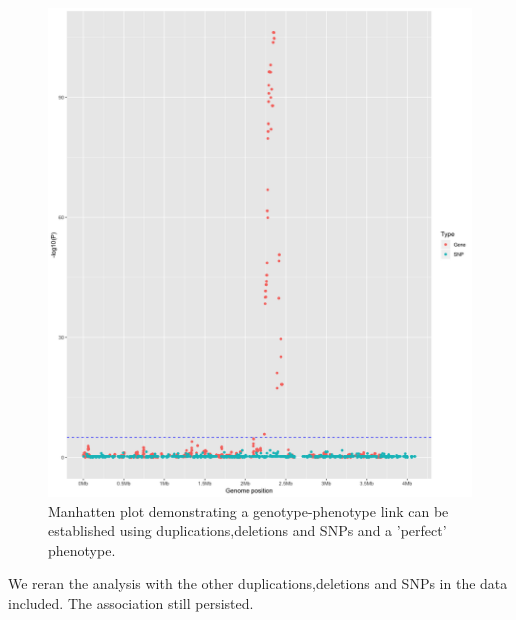 \documentclass{article}
\begin{document}
\clearpage
\begin{figure}[h!]
\centering
\includegraphics[width=\textwidth]{Chapter_3/Rplot15.png}
\caption{Manhatten plot demonstrating a genotype-phenotype link can be established using duplications,deletions and SNPs and a 'perfect' phenotype.}
\label{fig:Manhatten_1}
\end{figure}
\clearpage

We reran the analysis with the other duplications,deletions and SNPs in the data included. The association still persisted.
\clearpage





\end{document}
